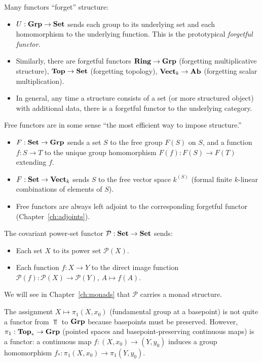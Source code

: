 \begin{example}
Many functors ``forget'' structure:
\begin{itemize}
  \item $U: \mathbf{Grp} \to \mathbf{Set}$ sends each group to its underlying set and each homomorphism to the underlying function. This is the prototypical \emph{forgetful functor}.
  \item Similarly, there are forgetful functors $\mathbf{Ring} \to \mathbf{Grp}$ (forgetting multiplicative structure), $\mathbf{Top} \to \mathbf{Set}$ (forgetting topology), $\mathbf{Vect}_k \to \mathbf{Ab}$ (forgetting scalar multiplication).
  \item In general, any time a structure consists of a set (or more structured object) with additional data, there is a forgetful functor to the underlying category.
\end{itemize}
\end{example}

\begin{example}
Free functors are in some sense ``the most efficient way to impose structure.''
\begin{itemize}
  \item $F: \mathbf{Set} \to \mathbf{Grp}$ sends a set $S$ to the free group $F(S)$ on $S$, and a function $f: S \to T$ to the unique group homomorphism $F(f): F(S) \to F(T)$ extending $f$.
  \item $F: \mathbf{Set} \to \mathbf{Vect}_k$ sends $S$ to the free vector space $k^{(S)}$ (formal finite $k$-linear combinations of elements of $S$).
  \item Free functors are always left adjoint to the corresponding forgetful functor (Chapter~\ref{ch:adjoints}).
\end{itemize}
\end{example}

\begin{example}
The covariant power-set functor $\mathcal{P}: \mathbf{Set} \to \mathbf{Set}$ sends:
\begin{itemize}
  \item Each set $X$ to its power set $\mathcal{P}(X)$.
  \item Each function $f: X \to Y$ to the direct image function $\mathcal{P}(f): \mathcal{P}(X) \to \mathcal{P}(Y)$, $A \mapsto f(A)$.
\end{itemize}
We will see in Chapter~\ref{ch:monads} that $\mathcal{P}$ carries a monad structure.
\end{example}

\begin{example}
The assignment $X \mapsto \pi_1(X, x_0)$ (fundamental group at a basepoint) is not quite a functor from $\Top$ to $\mathbf{Grp}$ because basepoints must be preserved. However, $\pi_1: \mathbf{Top}_* \to \mathbf{Grp}$ (pointed spaces and basepoint-preserving continuous maps) is a functor: a continuous map $f: (X, x_0) \to (Y, y_0)$ induces a group homomorphism $f_*: \pi_1(X,x_0) \to \pi_1(Y, y_0)$.
\end{example}

